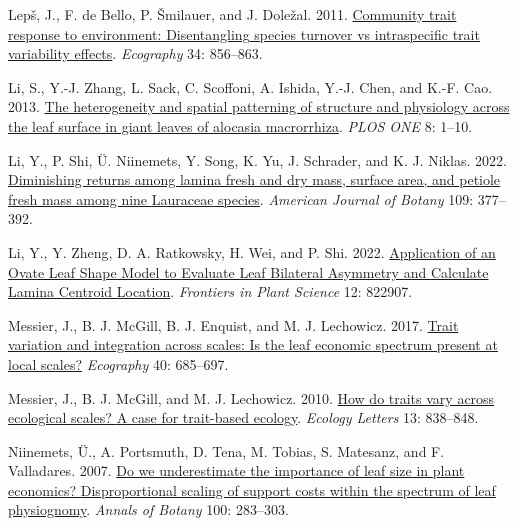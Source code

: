 \documentclass[
  12pt,
  a4paper,
,tablecaptionabove
]{scrartcl}
\newlength{\cslhangindent}
\newenvironment{CSLReferences}[2] %
 {%
  \setlength{\parindent}{0pt}
  \ifodd #1 \everypar{\setlength{\hangindent}{\cslhangindent}}\ignorespaces\fi
  \ifnum #2 > 0
  \setlength{\parskip}{#2\baselineskip}
  \fi
 }%
 {}
\begin{document}
\begin{CSLReferences}{1}{0}
\leavevmode{}%
Lepš, J., F. de Bello, P. Šmilauer, and J. Doležal. 2011. \href{https://doi.org/10.1111/j.1600-0587.2010.06904.x}{Community trait response to environment: {Disentangling} species turnover vs intraspecific trait variability effects}. \emph{Ecography} 34: 856--863.

\leavevmode{}%
Li, S., Y.-J. Zhang, L. Sack, C. Scoffoni, A. Ishida, Y.-J. Chen, and K.-F. Cao. 2013. \href{https://doi.org/10.1371/journal.pone.0066016}{The heterogeneity and spatial patterning of structure and physiology across the leaf surface in giant leaves of alocasia macrorrhiza}. \emph{PLOS ONE} 8: 1--10.

\leavevmode{}%
Li, Y., P. Shi, Ü. Niinemets, Y. Song, K. Yu, J. Schrader, and K. J. Niklas. 2022. \href{https://doi.org/10.1002/ajb2.1812}{Diminishing returns among lamina fresh and dry mass, surface area, and petiole fresh mass among nine {Lauraceae} species}. \emph{American Journal of Botany} 109: 377--392.

\leavevmode{}%
Li, Y., Y. Zheng, D. A. Ratkowsky, H. Wei, and P. Shi. 2022. \href{https://doi.org/10.3389/fpls.2021.822907}{Application of an {Ovate Leaf Shape Model} to {Evaluate Leaf Bilateral Asymmetry} and {Calculate Lamina Centroid Location}}. \emph{Frontiers in Plant Science} 12: 822907.

\leavevmode{}%
Messier, J., B. J. McGill, B. J. Enquist, and M. J. Lechowicz. 2017. \href{https://doi.org/10.1111/ecog.02006}{Trait variation and integration across scales: Is the leaf economic spectrum present at local scales?} \emph{Ecography} 40: 685--697.

\leavevmode{}%
Messier, J., B. J. McGill, and M. J. Lechowicz. 2010. \href{https://doi.org/10.1111/j.1461-0248.2010.01476.x}{How do traits vary across ecological scales? {A} case for trait-based ecology}. \emph{Ecology Letters} 13: 838--848.

\leavevmode{}%
Niinemets, Ü., A. Portsmuth, D. Tena, M. Tobias, S. Matesanz, and F. Valladares. 2007. \href{https://doi.org/10.1093/aob/mcm107}{Do we underestimate the importance of leaf size in plant economics? {Disproportional} scaling of support costs within the spectrum of leaf physiognomy}. \emph{Annals of Botany} 100: 283--303.


\end{CSLReferences}
\end{document}
